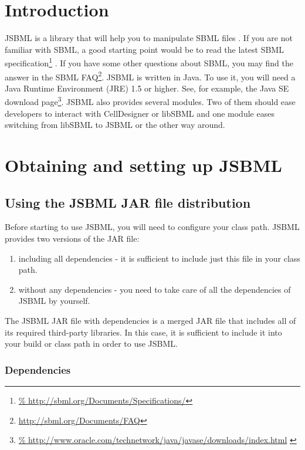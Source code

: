 \section{Introduction}

JSBML is a library that will help you to manipulate SBML files
\citep{Draeger2011a, Draeger2011b}. If you are not familiar with SBML, a good
starting point would be to read the latest SBML
specification\footnote{\url{%
http://sbml.org/Documents/Specifications/}} \citep{Hucka2010a}. If you have some
other questions about SBML, you may find the answer in the SBML
FAQ\footnote{\url{http://sbml.org/Documents/FAQ}}. JSBML is written in Java\TTra. To
use it, you will need a Java Runtime Environment (JRE) 1.5 or higher. See, for
example, the Java SE download page\footnote{\url{%
http://www.oracle.com/technetwork/java/javase/downloads/index.html}
\label{fn:jvmldl}}.
JSBML also provides several modules. Two of them should ease developers to
interact with CellDesigner or libSBML and one module eases switching from
libSBML to JSBML or the other way around.


\section{Obtaining and setting up JSBML}

\subsection{Using the JSBML JAR file distribution}
Before starting to use JSBML, you will need to configure your class path. JSBML
provides two versions of the JAR file:
\begin{enumerate}
\item including all dependencies - it is sufficient to include just this file in
      your class path.
\item without any dependencies - you need to take care of all the dependencies of
      JSBML by yourself.
\end{enumerate}

The JSBML JAR file with dependencies is a merged JAR file that includes all of
its required third-party libraries. In this case, it is sufficient to include
it into your build or class path in order to use JSBML.



\subsubsection{Dependencies}
%

